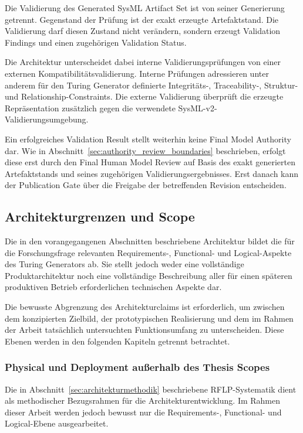 Die Validierung des Generated SysML Artifact Set ist von seiner Generierung
getrennt. Gegenstand der Prüfung ist der exakt erzeugte Artefaktstand. Die
Validierung darf diesen Zustand nicht verändern, sondern erzeugt
Validation Findings und einen zugehörigen Validation Status.

Die Architektur unterscheidet dabei interne Validierungsprüfungen von einer
externen Kompatibilitätsvalidierung. Interne Prüfungen adressieren unter
anderem für den Turing Generator definierte Integritäts-, Traceability-,
Struktur- und Relationship-Constraints. Die externe Validierung überprüft die
erzeugte Repräsentation zusätzlich gegen die verwendete SysML-v2-
Validierungsumgebung.

Ein erfolgreiches Validation Result stellt weiterhin keine Final Model
Authority dar. Wie in Abschnitt~\ref{sec:authority_review_boundaries}
beschrieben, erfolgt diese erst durch den Final Human Model Review auf Basis
des exakt generierten Artefaktstands und seines zugehörigen
Validierungsergebnisses. Erst danach kann der Publication Gate über die
Freigabe der betreffenden Revision entscheiden.

\subsection{Architekturgrenzen und Scope}
\label{sec:architecture_scope_boundaries}

Die in den vorangegangenen Abschnitten beschriebene Architektur bildet die
für die Forschungsfrage relevanten Requirements-, Functional- und
Logical-Aspekte des Turing Generators ab. Sie stellt jedoch weder eine
vollständige Produktarchitektur noch eine vollständige Beschreibung aller
für einen späteren produktiven Betrieb erforderlichen technischen Aspekte dar.

Die bewusste Abgrenzung des Architekturclaims ist erforderlich, um zwischen
dem konzipierten Zielbild, der prototypischen Realisierung und dem im Rahmen
der Arbeit tatsächlich untersuchten Funktionsumfang zu unterscheiden. Diese
Ebenen werden in den folgenden Kapiteln getrennt betrachtet.


\subsubsection{Physical und Deployment außerhalb des Thesis Scopes}
\label{sec:physical_out_of_scope}

Die in Abschnitt~\ref{sec:architekturmethodik} beschriebene
RFLP-Systematik dient als methodischer Bezugsrahmen für die
Architekturentwicklung. Im Rahmen dieser Arbeit werden jedoch bewusst nur die
Requirements-, Functional- und Logical-Ebene ausgearbeitet.


